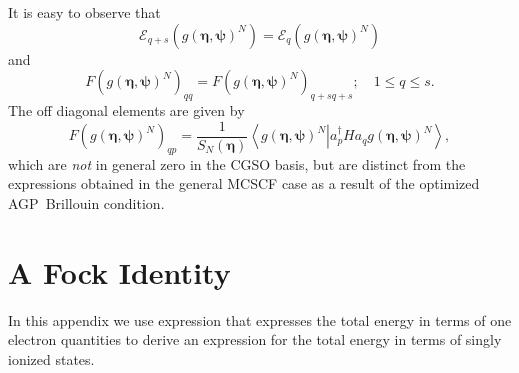\documentclass[titlepage]{article}%
\begin{document}
It is easy to observe that
\begin{equation}
\mathcal{E}_{q+s}\left(  g\left(  \bm{\eta},\bm{\psi}\right)  ^{N}\right)
=\mathcal{E}_{q}\left(  g\left(  \bm{\eta},\bm{\psi }\right)  ^{N}\right)
\end{equation}
and
\begin{equation}
F\left(  g\left(  \bm{\eta},\bm{\psi}\right)  ^{N}\right)  _{qq}=F\left(
g\left(  \bm{\eta},\bm{\psi}\right)  ^{N}\right)  _{q+sq+s};\quad1\leq q\leq
s.
\end{equation}
The off diagonal elements are given by
\begin{equation}
F\left(  g\left(  \bm{\eta},\bm{\psi}\right)  ^{N}\right)  _{qp}=\frac
{1}{S_{N}\left(  \bm{\eta}\right)  }\left\langle \left.  g\left(
\bm{\eta},\bm{\psi}\right)  ^{N}\right\vert a_{p}^{\dagger}Ha_{q}g\left(
\bm{\eta},\bm{\psi}\right)  ^{N}\right\rangle ,
\end{equation}
which are \emph{not }in general zero in the CGSO basis, but are distinct from
the expressions obtained in the general MCSCF case as a result of the
optimized AGP\ Brillouin condition.

\section{A Fock Identity\label{FockID}}

In this appendix we use expression that expresses the total energy in terms of
one electron quantities to derive an expression for the total energy in terms
of singly ionized states.
\end{document}

